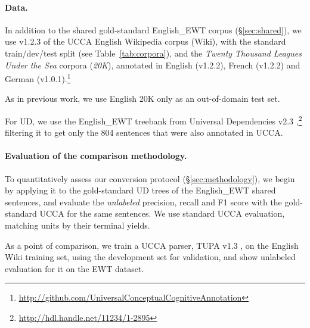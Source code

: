 \documentclass[11pt,a4paper]{article}
\begin{document}
\paragraph{Data.}

In addition to the shared gold-standard English\_EWT corpus (\S\ref{sec:shared}),
we use v1.2.3 of the UCCA English Wikipedia corpus (Wiki),
with the standard train/dev/test split (see Table~\ref{tab:corpora}),
and the \textit{Twenty Thousand Leagues Under the Sea} corpora (\textit{20K}),
annotated in English (v1.2.2), French (v1.2.2)
and German (v1.0.1).\footnote{\url{http://github.com/UniversalConceptualCognitiveAnnotation}}

As in previous work, we use English 20K only as an out-of-domain test set.


For UD, we use the English\_EWT treebank from Universal Dependencies v2.3
\cite{11234/1-2895},\footnote{\url{http://hdl.handle.net/11234/1-2895}}
filtering it to get only the 804 sentences that were also annotated in UCCA.


\paragraph{Evaluation of the comparison methodology.}

To quantitatively assess our conversion protocol (\S\ref{sec:methodology}),
we begin by applying it to
the gold-standard UD trees of the English\_EWT shared sentences,
and evaluate the \textit{unlabeled} precision, recall and F1 score
with the gold-standard UCCA for the same sentences.
We use standard UCCA evaluation, matching units by their terminal yields.

As a point of comparison, we train a UCCA parser,
TUPA v1.3 \cite{hershcovich2017a,hershcovich2018multitask},
on the English Wiki training set, using the development set for validation,
and show unlabeled evaluation for it on the EWT dataset.
\end{document}
